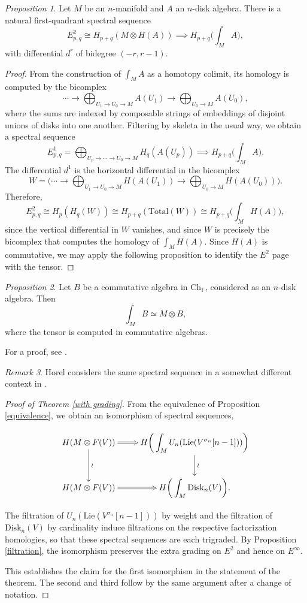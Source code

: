 \documentclass{compositio}
\theoremstyle{definition}\newtheorem{definition}{Definition}[section]
\theoremstyle{theorem}\newtheorem{lemma}[definition]{Lemma}
\theoremstyle{remark}\newtheorem*{conventions}{Conventions}
\theoremstyle{remark}\newtheorem*{acknowledgments}{Acknowledgments}
\theoremstyle{remark}\newtheorem*{outline}{Outline}
\theoremstyle{remark}\newtheorem*{questions}{Questions}
\theoremstyle{remark}\newtheorem{example}[definition]{Example}
\theoremstyle{definition}\newtheorem{construction}[definition]{Construction}
\theoremstyle{definition}\newtheorem*{convention}{Convention}
\theoremstyle{definition}\newtheorem*{conjecture}{Conjecture}
\theoremstyle{theorem}\newtheorem{theorem}[definition]{Theorem}
\theoremstyle{theorem}\newtheorem{paradigm}[definition]{Paradigm}
\theoremstyle{remark}\newtheorem{remark}[definition]{Remark}
\theoremstyle{corollary}\newtheorem{corollary}[definition]{Corollary}
\theoremstyle{theorem}\newtheorem{proposition}[definition]{Proposition}
\theoremstyle{definition}\newtheorem{question}[definition]{Question}
\begin{document}
\begin{proposition}\label{spectral sequence} Let $M$ be an $n$-manifold and $A$ an $n$-disk algebra.
There is a natural first-quadrant spectral sequence $$E^2_{p,q}\cong H_{p+q}(M\otimes H(A))\implies H_{p+q}\bigg(\int_MA\bigg),$$ with differential $d^r$ of bidegree $(-r,r-1)$.
\end{proposition}
\begin{proof}
From the construction of $\int_M A$ as a homotopy colimit, its homology is computed by the bicomplex $$\cdots\to\bigoplus_{U_1\to U_0\to M}A(U_1)\to \bigoplus_{U_0\to M} A(U_0),$$ where the sums are indexed by composable strings of embeddings of disjoint unions of disks into one another. Filtering by skeleta in the usual way, we obtain a spectral sequence $$E^1_{p,q}=\bigoplus_{U_p\to\cdots\to U_0\to M}H_q(A(U_p))\implies H_{p+q}\bigg(\int_M A\bigg).$$ The differential $d^1$ is the horizontal differential in the bicomplex $$W=\bigg(\cdots\to\bigoplus_{U_1\to U_0\to M}H(A(U_1))\to \bigoplus_{U_0\to M} H(A(U_0))\bigg).$$ Therefore, $$E^2_{p,q}\cong H_p(H_q(W))\cong H_{p+q}(\mathrm{Total}(W))\cong H_{p+q}\bigg(\int_M H(A)\bigg),$$ since the vertical differential in $W$ vanishes, and since $W$ is precisely the bicomplex that computes the homology of $\int_MH(A)$. Since $H(A)$ is commutative, we may apply the following proposition to identify the $E^2$ page with the tensor.
\end{proof}

\begin{proposition}
Let $B$ be a commutative algebra in ${\mathrm{Ch}}_\mathbb{F}$, considered as an $n$-disk algebra. Then $$\int_MB\simeq M\otimes B,$$ where the tensor is computed in commutative algebras.
\end{proposition}

For a proof, see \cite{Francis}.

\begin{remark}
Horel considers the same spectral sequence in a somewhat different context in \cite{Horel}.
\end{remark}

\begin{proof}[Proof of Theorem \ref{with grading}]
From the equivalence of Proposition \ref{equivalence}, we obtain an isomorphism of spectral sequences,

$$\xymatrix{
H(M\otimes F(V))\ar@{=>}[r]\ar[d]^\wr & \displaystyle H\bigg(\int_M U_n({\mathrm{Lie}}(V^{\sigma_n}[n-1]))\bigg)\ar[d]^\wr\\
H(M\otimes F(V))\ar@{=>}[r] & \displaystyle H\bigg(\int_M {\mathrm{Disk}}_n(V)\bigg).
}$$

The filtration of $U_n({\mathrm{Lie}}(V^{\sigma_n}[n-1]))$ by weight and the filtration of ${\mathrm{Disk}}_n(V)$ by cardinality induce filtrations on the respective factorization homologies, so that these spectral sequences are each trigraded. By Proposition \ref{filtration}, the isomorphism preserves the extra grading on $E^2$ and hence on $E^\infty$. 

This establishes the claim for the first isomorphism in the statement of the theorem. The second and third follow by the same argument after a change of notation.
\end{proof}
\end{document}
